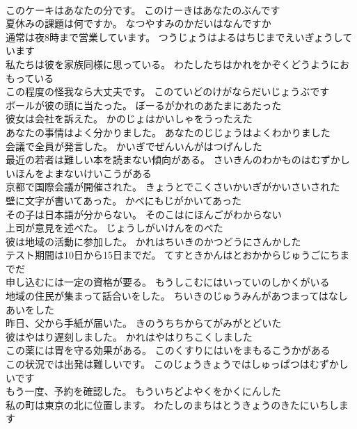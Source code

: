 \documentclass[8pt]{extreport}
\begin{document}
\begin{CJK}{UTF8}{min}
\\	このケーキはあなたの分です。	このけーきはあなたのぶんです 
\\	夏休みの課題は何ですか。	なつやすみのかだいはなんですか 
\\	通常は夜8時まで営業しています。	つうじょうはよるはちじまでえいぎょうしています 
\\	私たちは彼を家族同様に思っている。	わたしたちはかれをかぞくどうようにおもっている 
\\	この程度の怪我なら大丈夫です。	このていどのけがならだいじょうぶです 
\\	ボールが彼の頭に当たった。	ぼーるがかれのあたまにあたった 
\\	彼女は会社を訴えた。	かのじょはかいしゃをうったえた 
\\	あなたの事情はよく分かりました。	あなたのじじょうはよくわかりました 
\\	会議で全員が発言した。	かいぎでぜんいんがはつげんした 
\\	最近の若者は難しい本を読まない傾向がある。	さいきんのわかものはむずかしいほんをよまないけいこうがある 
\\	京都で国際会議が開催された。	きょうとでこくさいかいぎがかいさいされた 
\\	壁に文字が書いてあった。	かべにもじがかいてあった 
\\	その子は日本語が分からない。	そのこはにほんごがわからない 
\\	上司が意見を述べた。	じょうしがいけんをのべた 
\\	彼は地域の活動に参加した。	かれはちいきのかつどうにさんかした 
\\	テスト期間は10日から15日までだ。	てすときかんはとおかからじゅうごにちまでだ 
\\	申し込むには一定の資格が要る。	もうしこむにはいっていのしかくがいる 
\\	地域の住民が集まって話合いをした。	ちいきのじゅうみんがあつまってはなしあいをした 
\\	昨日、父から手紙が届いた。	きのうちちからてがみがとどいた 
\\	彼はやはり遅刻しました。	かれはやはりちこくしました 
\\	この薬には胃を守る効果がある。	このくすりにはいをまもるこうかがある 
\\	この状況では出発は難しいです。	このじょうきょうではしゅっぱつはむずかしいです 
\\	もう一度、予約を確認した。	もういちどよやくをかくにんした 
\\	私の町は東京の北に位置します。	わたしのまちはとうきょうのきたにいちします 

\end{CJK}
\end{document}
